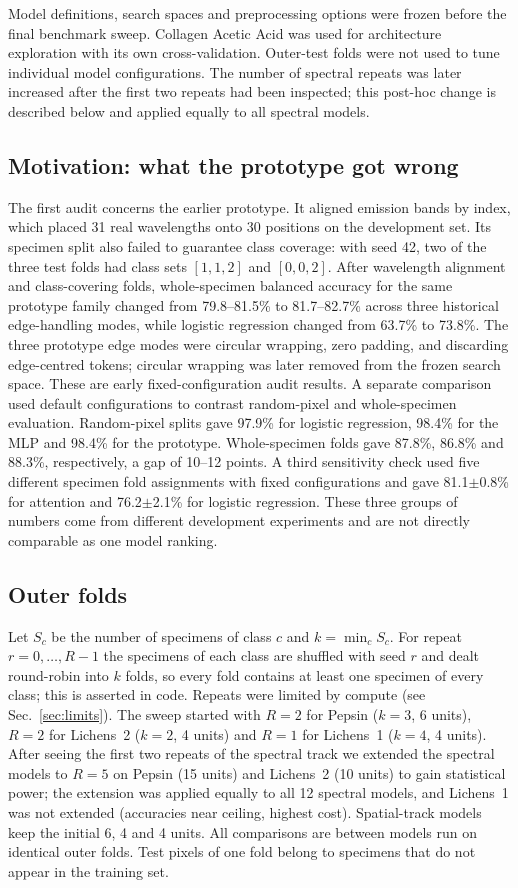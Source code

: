 \documentclass[journal]{IEEEtran}
\begin{document}
Model definitions, search spaces and preprocessing options were frozen before the final benchmark sweep. Collagen Acetic Acid was used for architecture exploration with its own cross-validation. Outer-test folds were not used to tune individual model configurations. The number of spectral repeats was later increased after the first two repeats had been inspected; this post-hoc change is described below and applied equally to all spectral models.

\subsection{Motivation: what the prototype got wrong}\label{sec:motivation}
The first audit concerns the earlier prototype. It aligned emission bands by index, which placed 31 real wavelengths onto 30 positions on the development set. Its specimen split also failed to guarantee class coverage: with seed 42, two of the three test folds had class sets $[1,1,2]$ and $[0,0,2]$. After wavelength alignment and class-covering folds, whole-specimen balanced accuracy for the same prototype family changed from 79.8--81.5\% to 81.7--82.7\% across three historical edge-handling modes, while logistic regression changed from 63.7\% to 73.8\%. The three prototype edge modes were circular wrapping, zero padding, and discarding edge-centred tokens; circular wrapping was later removed from the frozen search space. These are early fixed-configuration audit results. A separate comparison used default configurations to contrast random-pixel and whole-specimen evaluation. Random-pixel splits gave 97.9\% for logistic regression, 98.4\% for the MLP and 98.4\% for the prototype. Whole-specimen folds gave 87.8\%, 86.8\% and 88.3\%, respectively, a gap of 10--12 points. A third sensitivity check used five different specimen fold assignments with fixed configurations and gave 81.1$\pm$0.8\% for attention and 76.2$\pm$2.1\% for logistic regression. These three groups of numbers come from different development experiments and are not directly comparable as one model ranking.

\subsection{Outer folds}
Let $S_c$ be the number of specimens of class $c$ and $k=\min_c S_c$. For repeat $r=0,\dots,R-1$ the specimens of each class are shuffled with seed $r$ and dealt round-robin into $k$ folds, so every fold contains at least one specimen of every class; this is asserted in code. Repeats were limited by compute (see Sec.~\ref{sec:limits}). The sweep started with $R=2$ for Pepsin ($k=3$, 6 units), $R=2$ for Lichens~2 ($k=2$, 4 units) and $R=1$ for Lichens~1 ($k=4$, 4 units). After seeing the first two repeats of the spectral track we extended the spectral models to $R=5$ on Pepsin (15 units) and Lichens~2 (10 units) to gain statistical power; the extension was applied equally to all 12 spectral models, and Lichens~1 was not extended (accuracies near ceiling, highest cost). Spatial-track models keep the initial 6, 4 and 4 units. All comparisons are between models run on identical outer folds. Test pixels of one fold belong to specimens that do not appear in the training set.
\end{document}

